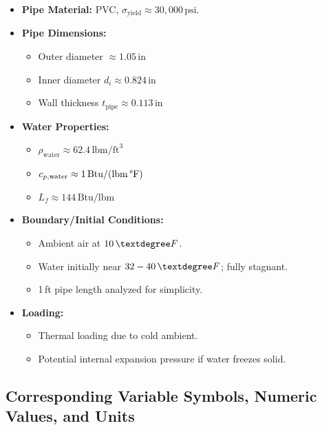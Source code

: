 \documentclass[12pt]{report}
\begin{document}
\begin{itemize}
    \item \textbf{Pipe Material:} PVC, $\sigma_{\text{yield}} \approx 30,000\,\text{psi}$.
    \item \textbf{Pipe Dimensions:}
    \begin{itemize}
        \item Outer diameter $\approx 1.05\,\text{in}$
        \item Inner diameter $d_i \approx 0.824\,\text{in}$
        \item Wall thickness $t_{\text{pipe}} \approx 0.113\,\text{in}$
    \end{itemize}
    \item \textbf{Water Properties:}
    \begin{itemize}
        \item $\rho_{\text{water}} \approx 62.4\,\text{lbm/ft}^3$
        \item $c_{p,\text{water}} \approx 1\,\text{Btu/(lbm\,\textdegree F)}$
        \item $L_f \approx 144\,\text{Btu/lbm}$
    \end{itemize}
    \item \textbf{Boundary/Initial Conditions:}
    \begin{itemize}
        \item Ambient air at $10\,\textdegree F$.
        \item Water initially near $32-40\,\textdegree F$; fully stagnant.
        \item 1\,ft pipe length analyzed for simplicity.
    \end{itemize}
    \item \textbf{Loading:}
    \begin{itemize}
        \item Thermal loading due to cold ambient.
        \item Potential internal expansion pressure if water freezes solid.
    \end{itemize}
\end{itemize}

\subsection{Corresponding Variable Symbols, Numeric Values, and Units}

\begin{itemize}
    \item $d_i = 0.824\,\text{in}, \quad L = 1\,\text{ft}$
    \item $\rho_{\text{water}} = 62.4\,\text{lbm/ft}^3, \quad c_{p,\text{water}} = 1\,\text{Btu/(lbm\,\textdegree F)}$
    \item $L_f = 144\,\text{Btu/lbm}$
    \item $h \approx 5\,\text{Btu/(hr\,ft}^2\,\textdegree F)}$ (moderate forced convection)
    \item $k_{\text{ins}} \approx 0.025\,\text{Btu/(hr\,ft\,\textdegree F)}$
    \item $t_{\text{pipe}} = 0.113\,\text{in}, \quad \sigma_{\text{yield}} \approx 30,000\,\text{psi}$
\end{itemize}
\end{document}
